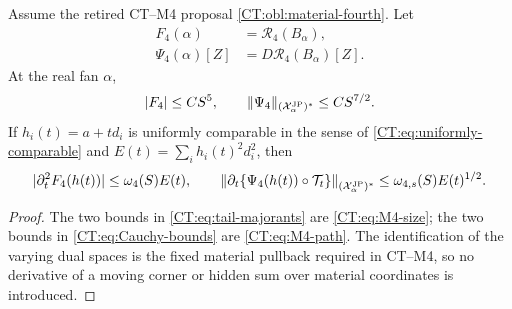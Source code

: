 \begin{lemma}
\label{CT:lem:Cauchy}
Assume the retired CT--M4 proposal \ref{CT:obl:material-fourth}.  Let
\begin{align*}
 F_4(\alpha)&=\mathcal R_4(B_\alpha),\\
 \Psi_4(\alpha)[Z]&=D\mathcal R_4(B_\alpha)[Z].
\end{align*}
At the real fan $\alpha$,
\begin{equation}\label{CT:eq:tail-majorants}
 |F_4|\le CS^5,\qquad
 \|\Psi_4\|_{(\mathcal X^{\rm JP}_\alpha)^*}\le CS^{7/2}.
\end{equation}
If $h_i(t)=a+t d_i$ is uniformly comparable in the sense of
\eqref{CT:eq:uniformly-comparable} and
$E(t)=\sum_i h_i(t)^2d_i^2$, then
\begin{equation}\label{CT:eq:Cauchy-bounds}
 |\partial_t^2F_4(h(t))|\le \omega_4(S)E(t),
 \qquad
 \left\|\partial_t\{\Psi_4(h(t))\circ\mathcal T_t\}
     \right\|_{(\mathcal X^{\rm JP}_\alpha)^*}
 \le \omega_{4,s}(S)E(t)^{1/2}.
\end{equation}
\end{lemma}

\begin{proof}
The two bounds in \eqref{CT:eq:tail-majorants} are
\eqref{CT:eq:M4-size}; the two bounds in \eqref{CT:eq:Cauchy-bounds} are
\eqref{CT:eq:M4-path}.  The identification of the varying dual spaces is the
fixed material pullback required in CT--M4, so no derivative of a moving
corner or hidden sum over material coordinates is introduced.
\end{proof}

